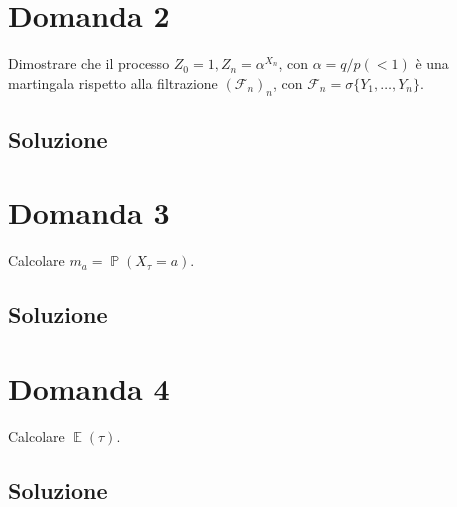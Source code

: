 \documentclass[
	12pt, %
]{fphw}
\DeclareMathOperator{\Ev}{\mathbb{E}}%
\DeclareMathOperator{\Pro}{\mathbb{P}}%
\begin{document}
\section*{Domanda 2}
\begin{problem}
	Dimostrare che il processo $Z_0 = 1, Z_n = \alpha^{X_n}$, con $\alpha = q/p(< 1)$ è una martingala
	rispetto alla filtrazione $(\mathcal{F}_n)_n$, con $\mathcal{F}_n = \sigma\{Y_1, \dots , Y_n\}$.
	\smallskip
\end{problem}

\subsection*{Soluzione}



\section*{Domanda 3}
\begin{problem}
	Calcolare $m_a = \Pro(X_{\tau} = a)$.
	\smallskip
\end{problem}

\subsection*{Soluzione}



\section*{Domanda 4}
\begin{problem}
	Calcolare $\Ev(\tau)$.
	\smallskip
\end{problem}

\subsection*{Soluzione}
\end{document}
